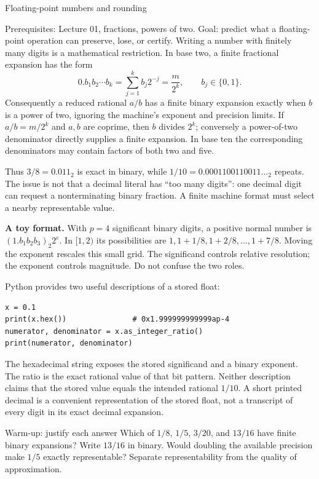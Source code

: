 \def\lecturenumber{02}


\opening{Floating-point numbers and rounding}{Prerequisites: Lecture 01, fractions, powers of two.\newline
Goal: predict what a floating-point operation can preserve, lose, or certify.}
Writing a number with finitely many digits is a mathematical restriction. In base
two, a finite fractional expansion has the form
\[
 0.b_1b_2\cdots b_k=\sum_{j=1}^{k}b_j2^{-j}=\frac{m}{2^k},
 \qquad b_j\in\{0,1\}.
\]
Consequently a reduced rational $a/b$ has a finite binary expansion exactly when
$b$ is a power of two, ignoring the machine's exponent and precision limits.
If $a/b=m/2^k$ and $a,b$ are coprime, then $b$ divides $2^k$; conversely a
power-of-two denominator directly supplies a finite expansion. In base ten the
corresponding denominators may contain factors of both two and five.

Thus $3/8=0.011_2$ is exact in binary, while
$1/10=0.0001100110011\ldots_2$ repeats. The issue is not that a decimal literal
has ``too many digits'': one decimal digit can request a nonterminating binary
fraction. A finite machine format must select a nearby representable value.

\textbf{A toy format.} With $p=4$ significant binary digits, a positive normal
number is $(1.b_1b_2b_3)_2 2^e$. In $[1,2)$ its possibilities are
$1,1+1/8,1+2/8,\ldots,1+7/8$. Moving the exponent rescales this small grid.
The significand controls relative resolution; the exponent controls magnitude.
Do not confuse the two roles.

Python provides two useful descriptions of a stored float:
\begin{lstlisting}
x = 0.1
print(x.hex())               # 0x1.999999999999ap-4
numerator, denominator = x.as_integer_ratio()
print(numerator, denominator)
\end{lstlisting}
The hexadecimal string exposes the stored significand and a binary exponent.
The ratio is the exact rational value of that bit pattern. Neither description
claims that the stored value equals the intended rational $1/10$.
A short printed decimal is a convenient representation of the stored float,
not a transcript of every digit in its exact decimal expansion.

\begin{question}{Warm-up: justify each answer}
Which of $1/8$, $1/5$, $3/20$, and $13/16$ have finite binary expansions?
Write $13/16$ in binary. Would doubling the available precision make $1/5$
exactly representable? Separate representability from the quality of approximation.
\end{question}


